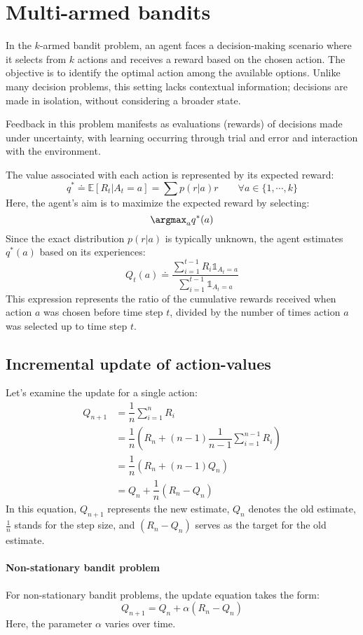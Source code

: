 \section{Multi-armed bandits}

In the $k$-armed bandit problem, an agent faces a decision-making scenario where it selects from $k$ actions and receives a reward based on the chosen action. 
The objective is to identify the optimal action among the available options. 
Unlike many decision problems, this setting lacks contextual information; decisions are made in isolation, without considering a broader state.

Feedback in this problem manifests as evaluations (rewards) of decisions made under uncertainty, with learning occurring through trial and error and interaction with the environment.

The value associated with each action is represented by its expected reward:
\[q^\ast\doteq\mathbb{E}[R_t|A_t=a]=\sum p(r|a)r\qquad\forall a\in\{1,\cdots,k\}\]
Here, the agent's aim is to maximize the expected reward by selecting:
\[\argmax_a q^\ast(a)\]
Since the exact distribution $p(r|a)$ is typically unknown, the agent estimates $q^\ast (a)$ based on its experiences:
\[Q_t(a)\doteq\dfrac{\sum_{i=1}^{t-1}R_i\mathbb{1}_{A_t=a}}{\sum_{i=1}^{t-1}\mathbb{1}_{A_t=a}}\]
This expression represents the ratio of the cumulative rewards received when action $a$ was chosen before time step $t$, divided by the number of times action $a$ was selected up to time step $t$.

\subsection{Incremental update of action-values}
Let's examine the update for a single action:
\begin{align*}
    Q_{n+1} &=\dfrac{1}{n}\sum_{i=1}^{n}R_i \\
            &=\dfrac{1}{n}\left(R_n+(n-1)\dfrac{1}{n-1}\sum_{i=1}^{n-1}R_i\right) \\
            &=\dfrac{1}{n}\left(R_n+(n-1)Q_n\right) \\
            &=Q_n+\dfrac{1}{n}\left(R_n-Q_n\right)
\end{align*}
In this equation, $Q_{n+1}$ represents the new estimate, $Q_{n}$ denotes the old estimate, $\frac{1}{n}$ stands for the step size, and $\left(R_n-Q_n\right)$ serves as the target for the old estimate.

\paragraph*{Non-stationary bandit problem}
For non-stationary bandit problems, the update equation takes the form:
\[Q_{n+1}=Q_n+\alpha\left(R_n-Q_n\right)\]
Here, the parameter $\alpha$ varies over time.

